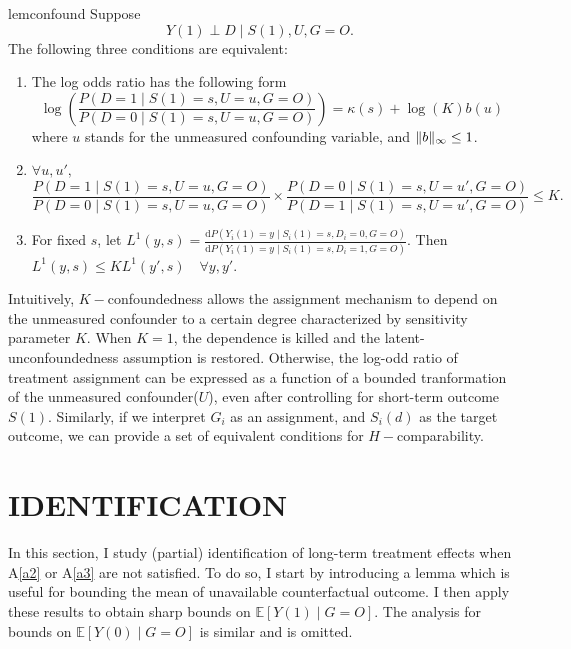\documentclass[12pt]{article}
\newcommand{\Ep}{\mathbb{E}}
\DeclarePairedDelimiter{\norm}{\lVert}{\rVert}
\begin{document}
	\begin{restatable}{lem}{confound}
		\label{confound}
		Suppose $$Y(1) \perp D \mid S(1), U, G = O.$$
		The following three conditions are equivalent:
		\begin{enumerate}[label=(\alph*)]
			\item The log odds ratio has the following form $$\log \left(\frac{P(D=1 \mid S(1) = s, U=u, G = O)}{P(D=0 \mid S(1)=s, U=u, G = O)}\right)=\kappa(s)+\log (K) b(u)$$
			where $u$ stands for the unmeasured confounding variable, and $\norm{b}_{\infty} \leq 1$.

			\item $\forall u, u',$ $$\frac{P(D=1 \mid S(1) = s, U=u, G =O)}{P(D=0 \mid S(1)=s, U=u, G = O)} \times\frac{P(D=0 \mid S(1) = s, U=u', G =O)}{P(D=1 \mid S(1)=s, U=u', G = O)} \leq K.$$
			
			\item For fixed $s$, let $L^1(y,s) = \frac{\mathrm{d} P(Y_i(1) = y \mid S_i(1) = s, D_i = 0, G = O)}{\mathrm{d} P(Y_i(1) = y \mid S_i(1) = s, D_i = 1, G = O)}$. Then $L^1(y,s) \leq K L^1(y',s) \quad \forall y,y'$.
		\end{enumerate}
	\end{restatable}
	    
	Intuitively, $K-$confoundedness allows the assignment mechanism to depend on the unmeasured confounder to a certain degree characterized by sensitivity parameter $K$. When $K = 1$, the dependence is killed and the latent-unconfoundedness assumption is restored. Otherwise, the log-odd ratio of treatment assignment can be expressed as a function of a bounded tranformation of the unmeasured confounder($U$), even after controlling for short-term outcome $S(1)$. Similarly, if we interpret $G_i$ as an assignment, and $S_i(d)$ as the target outcome, we can provide a set of equivalent conditions for $H-$comparability.
	
	\section{IDENTIFICATION}
	
	In this section, I study (partial) identification of long-term treatment effects when A\ref{a2} or A\ref{a3} are not satisfied. To do so, I start by introducing a lemma which is useful for bounding the mean of unavailable counterfactual outcome. I then apply these results to obtain sharp bounds on $\Ep[Y(1) \mid G = O]$. The analysis for bounds on $\Ep[Y(0) \mid G = O]$ is similar and is omitted.
	
\end{document}

